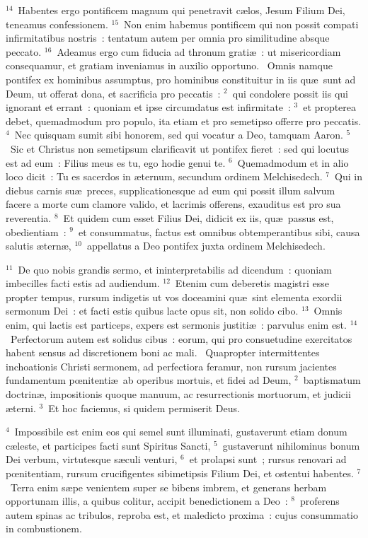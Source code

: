 ${}^{14}$~Habentes ergo pontificem magnum qui penetravit c\ae los, Jesum Filium Dei, teneamus confessionem.
${}^{15}$~Non enim habemus pontificem qui non possit compati infirmitatibus nostris~: tentatum autem per omnia pro similitudine absque peccato.
${}^{16}$~Adeamus ergo cum fiducia ad thronum grati\ae~: ut misericordiam consequamur, et gratiam inveniamus in auxilio opportuno.
~Omnis namque pontifex ex hominibus assumptus, pro hominibus constituitur in iis qu\ae\ sunt ad Deum, ut offerat dona, et sacrificia pro peccatis~:
${}^{2}$~qui condolere possit iis qui ignorant et errant~: quoniam et ipse circumdatus est infirmitate~:
${}^{3}$~et propterea debet, quemadmodum pro populo, ita etiam et pro semetipso offerre pro peccatis.
${}^{4}$~Nec quisquam sumit sibi honorem, sed qui vocatur a Deo, tamquam Aaron.
${}^{5}$~Sic et Christus non semetipsum clarificavit ut pontifex fieret~: sed qui locutus est ad eum~: Filius meus es tu, ego hodie genui te.
${}^{6}$~Quemadmodum et in alio loco dicit~: Tu es sacerdos in \ae ternum, secundum ordinem Melchisedech.
${}^{7}$~Qui in diebus carnis su\ae\ preces, supplicationesque ad eum qui possit illum salvum facere a morte cum clamore valido, et lacrimis offerens, exauditus est pro sua reverentia.
${}^{8}$~Et quidem cum esset Filius Dei, didicit ex iis, qu\ae\ passus est, obedientiam~:
${}^{9}$~et consummatus, factus est omnibus obtemperantibus sibi, causa salutis \ae tern\ae ,
${}^{10}$~appellatus a Deo pontifex juxta ordinem Melchisedech.


${}^{11}$~De quo nobis grandis sermo, et ininterpretabilis ad dicendum~: quoniam imbecilles facti estis ad audiendum.
${}^{12}$~Etenim cum deberetis magistri esse propter tempus, rursum indigetis ut vos doceamini qu\ae\ sint elementa exordii sermonum Dei~: et facti estis quibus lacte opus sit, non solido cibo.
${}^{13}$~Omnis enim, qui lactis est particeps, expers est sermonis justiti\ae~: parvulus enim est.
${}^{14}$~Perfectorum autem est solidus cibus~: eorum, qui pro consuetudine exercitatos habent sensus ad discretionem boni ac mali.
~Quapropter intermittentes inchoationis Christi sermonem, ad perfectiora feramur, non rursum jacientes fundamentum pœnitenti\ae\ ab operibus mortuis, et fidei ad Deum,
${}^{2}$~baptismatum doctrin\ae , impositionis quoque manuum, ac resurrectionis mortuorum, et judicii \ae terni.
${}^{3}$~Et hoc faciemus, si quidem permiserit Deus.


${}^{4}$~Impossibile est enim eos qui semel sunt illuminati, gustaverunt etiam donum c\ae leste, et participes facti sunt Spiritus Sancti,
${}^{5}$~gustaverunt nihilominus bonum Dei verbum, virtutesque s\ae culi venturi,
${}^{6}$~et prolapsi sunt~; rursus renovari ad pœnitentiam, rursum crucifigentes sibimetipsis Filium Dei, et ostentui habentes.
${}^{7}$~Terra enim s\ae pe venientem super se bibens imbrem, et generans herbam opportunam illis, a quibus colitur, accipit benedictionem a Deo~:
${}^{8}$~proferens autem spinas ac tribulos, reproba est, et maledicto proxima~: cujus consummatio in combustionem.


